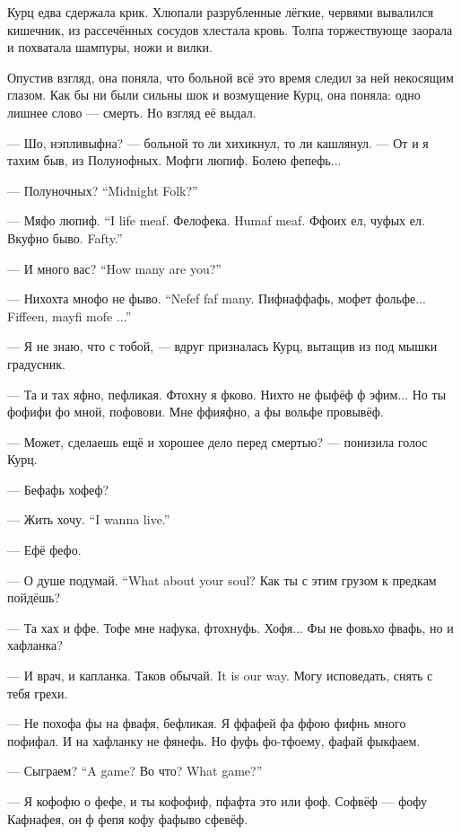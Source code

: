 Курц едва сдержала крик.
Хлюпали разрубленные лёгкие, червями вывалился кишечник, из рассечённых сосудов хлестала кровь.
Толпа торжествующе заорала и похватала шампуры, ножи и вилки.

Опустив взгляд, она поняла, что больной всё это время следил за ней некосящим глазом.
Как бы ни были сильны шок и возмущение Курц, она поняла: одно лишнее слово --- смерть.
Но взгляд её выдал.

--- Шо, нэпливыфна? --- больной то ли хихикнул, то ли кашлянул.
--- От и я тахим быв, из Полунофных.
Мофги люпиф.
Болею фепефь...

{--- Полуночных?}
{``Midnight Folk?''}

{--- Мяфо люпиф.}
{``I life meaf.}
{Фелофека.}
{Humaf meaf.}
Ффоих ел, чуфых ел.
{Вкуфно быво.}
{Fafty.''}

{--- И много вас?}
{``How many are you?''}

{--- Нихохта мнофо не фыво.}
{``Nefef faf many.}
{Пифнаффафь, мофет фольфе...}
{Fiffeen, mayfi mofe ...''}

--- Я не знаю, что с тобой, --- вдруг призналась Курц, вытащив из под мышки градусник.

--- Та и тах яфно, пефликая.
Фтохну я фково.
Нихто не фыфёф ф эфим...
Но ты фофифи фо мной, пофовови.
Мне ффияфно, а фы вольфе провывёф.

--- Может, сделаешь ещё и хорошее дело перед смертью? --- понизила голос Курц.

--- Бефафь хофеф?

{--- Жить хочу.}
{``I wanna live.''}

--- Ефё фефо.

{--- О душе подумай.}
{``What about your soul?}
Как ты с этим грузом к предкам пойдёшь?

--- Та хах и ффе.
Тофе мне нафука, фтохнуфь.
Хофя...
Фы не фовьхо фвафь, но и хафланка?

--- И врач, и капланка.
{Таков обычай.}
{It is our way.}
Могу исповедать, снять с тебя грехи.

--- Не похофа фы на фвафя, бефликая.
Я ффафей фа ффою фифнь много пофифал.
И на хафланку не фянефь.
Но фуфь фо-тфоему, фафай фыкфаем.

{--- Сыграем?}
{``A game?}
{Во что?}
{What game?''}

--- Я кофофю о фефе, и ты кофофиф, пфафта это или фоф.
Софвёф --- фофу Кафнафея, он ф фепя кофу фафыво сфевёф.

